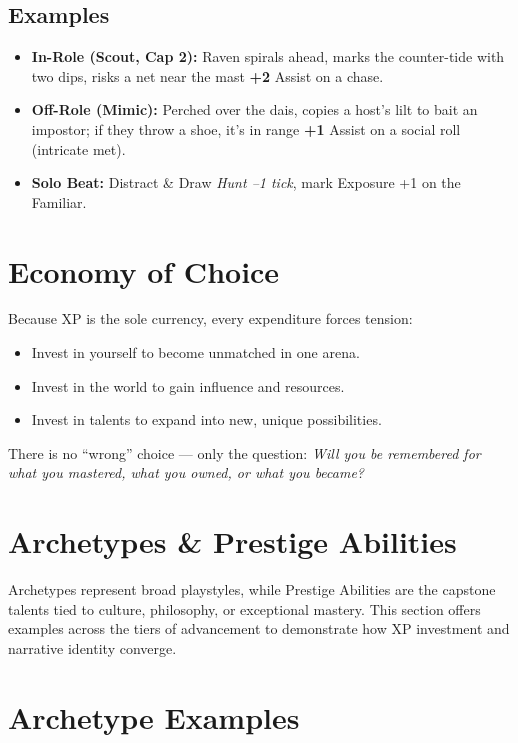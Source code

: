 \documentclass[12pt]{article}
\begin{document}
\subsection*{Examples} 
\begin{itemize}
  \item \textbf{In-Role (Scout, Cap 2):} Raven spirals ahead, marks the counter-tide with two dips, risks a net near the mast \textrightarrow{} \textbf{+2} Assist on a chase.
  \item \textbf{Off-Role (Mimic):} Perched over the dais, copies a host’s lilt to bait an impostor; if they throw a shoe, it’s in range \textrightarrow{} \textbf{+1} Assist on a social roll (intricate met).
  \item \textbf{Solo Beat:} Distract \& Draw \textrightarrow{} \emph{Hunt --1 tick}, mark Exposure +1 on the Familiar.
\end{itemize}

\section{Economy of Choice}
Because XP is the sole currency, every expenditure forces tension:  

\begin{itemize}
  \item Invest in yourself to become unmatched in one arena.  
  \item Invest in the world to gain influence and resources.  
  \item Invest in talents to expand into new, unique possibilities.  
\end{itemize}

There is no “wrong” choice — only the question: \emph{Will you be remembered for what you mastered, what you owned, or what you became?}

\section{Archetypes \& Prestige Abilities}

Archetypes represent broad playstyles, while Prestige Abilities are the capstone talents tied to culture, philosophy, or exceptional mastery.  
This section offers examples across the tiers of advancement to demonstrate how XP investment and narrative identity converge.

\section{Archetype Examples}
\end{document}
